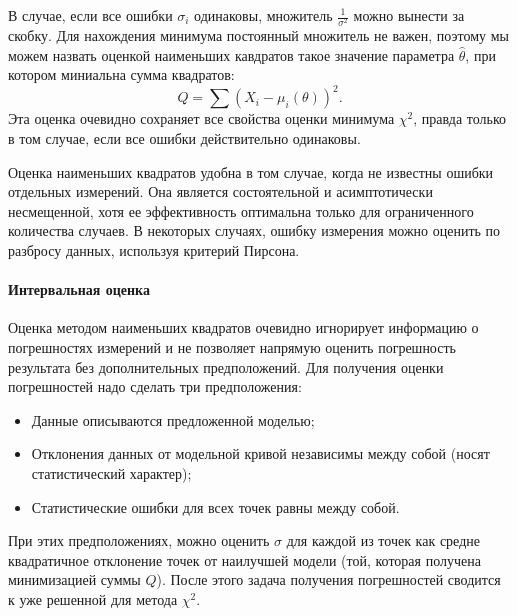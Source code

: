     В случае, если все ошибки $\sigma_i$ одинаковы, множитель
$\frac{1}{\sigma^2}$ можно вынести за скобку. Для нахождения минимума
постоянный множитель не важен, поэтому мы можем назвать оценкой
наименьших кавдратов такое значение параметра $\hat\theta$, при
котором миниальна сумма квадратов:
\begin{equation}
  Q = \sum{(X_i - \mu_i(\theta))^2}.
\end{equation}
Эта оценка очевидно сохраняет все свойства оценки
минимума $\chi^2$, правда только в том случае, если все ошибки
действительно одинаковы.

Оценка наименьших квадратов удобна в том случае, когда не известны
ошибки отдельных измерений. Она является состоятельной и асимптотически
несмещенной, хотя ее эффективность оптимальна только для ограниченного
количества случаев. В некоторых случаях, ошибку измерения можно оценить
по разбросу данных, используя критерий Пирсона.

\paragraph{Интервальная оценка}

Оценка методом наименьших квадратов очевидно игнорирует информацию о
погрешностях измерений и не позволяет напрямую оценить погрешность
результата без дополнительных предположений. Для получения оценки
погрешностей надо сделать три предположения:

\begin{itemize}
    \item  Данные описываются предложенной моделью;
    \item  Отклонения данных от модельной кривой независимы между собой (носят
  статистический характер);
    \item  Статистические ошибки для всех точек равны между собой.
\end{itemize}

При этих предположениях, можно оценить $\sigma$ для каждой из точек
как средне квадратичное отклонение точек от наилучшей модели (той,
которая получена минимизацией суммы $Q$). После этого задача получения
погрешностей сводится к уже решенной для метода $\chi^2$.



